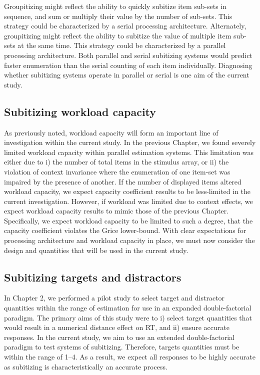 Groupitizing might reflect the ability to quickly subitize item sub-sets in sequence, and sum or multiply their value by the number of sub-sets. This strategy could be characterized by a serial processing architecture. Alternately, groupitizing might reflect the ability to subitize the value of multiple item sub-sets at the same time. This strategy could be characterized by a parallel processing architecture. Both parallel and serial subitizing systems would predict faster enumeration than the serial counting of each item individually. Diagnosing whether subitizing systems operate in parallel or serial is one aim of the current study. 

\subsection{Subitizing workload capacity}
As previously noted, workload capacity will form an important line of investigation within the current study. In the previous Chapter, we found severely limited workload capacity within parallel estimation systems. This limitation was either due to i) the number of total items in the stimulus array, or ii) the violation of context invariance where the enumeration of one item-set was impaired by the presence of another. If the number of displayed items altered workload capacity, we expect capacity coefficient results to be less-limited in the current investigation. However, if workload was limited due to context effects, we expect workload capacity results to mimic those of the previous Chapter. Specifically, we expect workload capacity to be limited to such a degree, that the capacity coefficient violates the Grice lower-bound. With clear expectations for processing architecture and workload capacity in place, we must now consider the design and quantities that will be used in the current study. 

\subsection{Subitizing targets and distractors}
In Chapter 2, we performed a pilot study to select target and distractor quantities within the range of estimation for use in an expanded double-factorial paradigm. The primary aims of this study were to i) select target quantities that would result in a numerical distance effect on RT, and ii) ensure accurate responses. In the current study, we aim to use an extended double-factorial paradigm to test systems of subitizing. Therefore, targets quantities must be within the range of 1--4. As a result, we expect all responses to be highly accurate as subitizing is characteristically an accurate process.

